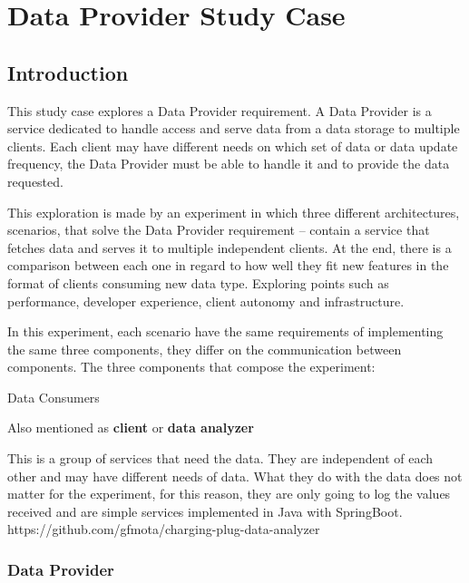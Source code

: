 \newcommand{\sla}{\textbackslash}

\newcommand{\cmd}[1]{\textsf{#1}}

\newcommand{\pkg}[1]{\textsf{#1}}

\newcommand{\ltxcmd}[1]{\cmd{\sla{}#1}}

\chapter{Data Provider Study Case}
\label{chap:dataprovider}

\section{Introduction}
\label{sec:introductionprov}

This study case explores a Data Provider requirement. A Data Provider is a service dedicated to handle access and serve data from a data storage to multiple clients. Each client may have different needs on which set of data or data update frequency, the Data Provider must be able to handle it and to provide the data requested.

This exploration is made by an experiment in which three different architectures, scenarios, that solve the Data Provider requirement – contain a service that fetches data and serves it to multiple independent clients. At the end, there is a comparison between each one in regard to how well they fit new features in the format of clients consuming new data type. Exploring points such as performance, developer experience, client autonomy and infrastructure.

In this experiment, each scenario have the same requirements of implementing the same three components, they differ on the communication between components. The three components that compose the experiment:

{Data Consumers}
\label{sec:dataconsumer}

Also mentioned as \textbf{client} or \textbf{data analyzer}

This is a group of services that need the data. They are independent of each other and may have different needs of data. What they do with the data does not matter for the experiment, for this reason, they are only going to log the values received and are simple services implemented in Java with SpringBoot. https://github.com/gfmota/charging-plug-data-analyzer

\subsection*{Data Provider}
\label{sec:dataprovider}

